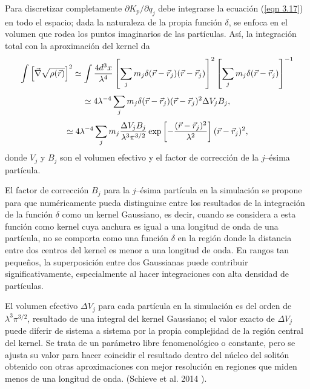 \documentclass[a4paper,openright,12pt]{book}
\begin{document}
Para discretizar completamente $\partial K_{p}/\partial q_{j}$ debe integrarse la ecuación (\ref{eqn 3.17}) en todo el espacio; dada la naturaleza de la propia función $\delta$, se enfoca en el volumen que rodea los puntos imaginarios de las partículas. Así, la integración total con la aproximación del kernel da
\begin{equation}
\int\left[\vec{\nabla}\sqrt{\rho (\vec{r})}\right]^{2}  \simeq 
\int \footnotesize{\frac{4 d^{3}x}{\lambda^{4}}
\left[
\sum_{j} m_{j}\delta(\vec{r}-\vec{r}_{j})(\vec{r}-\vec{r}_{j})
\right]^{2}
\left[
\sum_{j}m_{j}\delta(\vec{r}-\vec{r}_{j})
\right]^{-1}}\label{eqn 3.18}
\end{equation} 
\begin{equation}
\simeq
\footnotesize{4\lambda ^{-4} 
\sum_{j}m_{j}\delta(\vec{r}-\vec{r}_{j})(\vec{r}-\vec{r}_{j})^{2}\Delta V_{j}B_{j},}\label{eqn 3.19}
\end{equation}
\begin{equation}
\simeq
\footnotesize{4\lambda^{-4}
\sum_{j}m_{j}
\frac{\Delta V_{j}B_{j}}{\lambda^{3}\pi^{3/2}}
\exp\left[-\frac{(\vec{r}-\vec{r}_{j})^{2}}{\lambda^{2}}\right]
(\vec{r}-\vec{r}_{j})^{2},} \label{eqn 3.20}
\end{equation}
donde $V_{j}$ y $B_{j}$ son el volumen efectivo y el factor de corrección de la $j$--ésima partícula. 

El factor de corrección $B_{j}$ para la $j$--ésima partícula en la simulación se propone para que numéricamente pueda distinguirse entre los resultados de la integración de la función $\delta$ como un kernel Gaussiano, es decir,  cuando se considera a esta función como kernel cuya anchura es igual a una longitud de onda de una partícula, no se comporta como una función $\delta$ en la  región donde la distancia entre dos centros del kernel es menor a una longitud de onda. En rangos tan pequeños, la superposición entre dos Gaussianas puede contribuir significativamente, especialmente al hacer integraciones con alta densidad de partículas.

El volumen efectivo $\Delta V_{j}$ para cada partícula en la simulación es del orden de $\lambda^{3}\pi^{3/2}$, resultado de una integral del kernel Gaussiano; el valor exacto de $\Delta V_{j}$ puede diferir de  sistema a sistema por la propia complejidad de la región central del kernel. Se trata de un parámetro libre fenomenológico o constante, pero se ajusta su valor para hacer coincidir el resultado dentro del núcleo del solitón obtenido con otras aproximaciones con mejor resolución en regiones que miden menos de una longitud de onda. (Schieve et al. 2014 \cite{3.5}).
\end{document}
